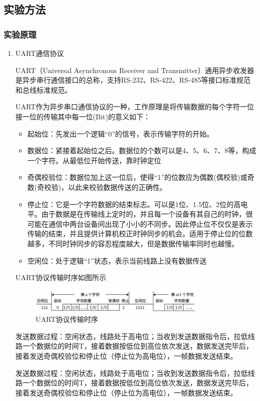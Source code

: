 ﻿\documentclass[UTF8,12pt]{article}
\begin{document}
\subsection{实验方法}
\subsubsection{实验原理}
\begin{enumerate}
  \item UART通信协议
  
  UART（Universal Asynchronous Receiver and Transmitter）通用异步收发器是异步串行通信接口的总称，支持RS-232、RS-422、RS-485等接口标准规范和总线标准规范。

  UART作为异步串口通信协议的一种，工作原理是将传输数据的每个字符一位接一位的传输其中每一位(Bit)的意义如下：
  \begin{itemize}
    \item 起始位：先发出一个逻辑“0”的信号，表示传输字符的开始。
    \item 数据位：紧接着起始位之后。数据位的个数可以是4、5、6、7、8等，构成一个字符。从最低位开始传送，靠时钟定位
    \item 奇偶校验位：数据位加上这一位后，使得“1”的位数应为偶数(偶校验)或奇数(奇校验)，以此来校验数据传送的正确性。
    \item 停止位：它是一个字符数据的结束标志。可以是1位、1.5位、2位的高电平。由于数据是在传输线上定时的，并且每一个设备有其自己的时钟，很可能在通信中两台设备间出现了小小的不同步。因此停止位不仅仅是表示传输的结束，并且提供计算机校正时钟同步的机会。适用于停止位的位数越多，不同时钟同步的容忍程度越大，但是数据传输率同时也越慢。
    \item 空闲位：处于逻辑“1”状态，表示当前线路上没有数据传送
  \end{itemize}
  UART协议传输时序如图所示
  \begin{figure}[htbp]
    \centering
    \includegraphics[width=0.8\textwidth]{imgs/12.png}
    \caption{UART协议传输时序}
  \end{figure}

  发送数据过程：空闲状态，线路处于高电位；当收到发送数据指令后，拉低线路一个数据位的时间T，接着数据按低位到高位依次发送，数据发送完毕后，接着发送奇偶校验位和停止位（停止位为高电位），一帧数据发送结束。

  发送数据过程：空闲状态，线路处于高电位；当收到发送数据指令后，拉低线路一个数据位的时间T，接着数据按低位到高位依次发送，数据发送完毕后，接着发送奇偶校验位和停止位（停止位为高电位），一帧数据发送结束。


\end{enumerate}
\end{document}

